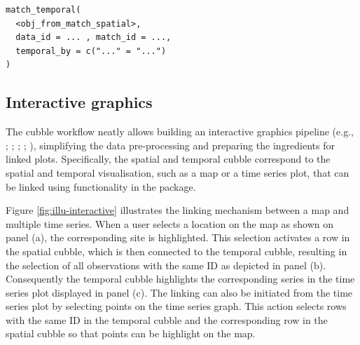 \documentclass[
  shortnames]{jss}
\begin{document}
\begin{verbatim}
match_temporal(
  <obj_from_match_spatial>, 
  data_id = ... , match_id = ..., 
  temporal_by = c("..." = "...")
)
\end{verbatim}

\hypertarget{interactive-graphics}{%
\subsection{Interactive graphics}\label{interactive-graphics}}

The cubble workflow neatly allows building an interactive graphics pipeline (e.g., \citet{buja1988elements}; \citet{buja1996interactive}; \citet{sutherland2000orca}; \citet{xie2014reactive}; \citet{cheng2016enabling}), simplifying the data pre-processing and preparing the ingredients for linked plots. Specifically, the spatial and temporal cubble correspond to the spatial and temporal visualisation, such as a map or a time series plot, that can be linked using functionality in the  \citep{crosstalk} package.

Figure \ref{fig:illu-interactive} illustrates the linking mechanism between a map and multiple time series. When a user selects a location on the map as shown on panel (a), the corresponding site is highlighted. This selection activates a row in the spatial cubble, which is then connected to the temporal cubble, resulting in the selection of all observations with the same ID as depicted in panel (b). Consequently the temporal cubble highlights the corresponding series in the time series plot displayed in panel (c). The linking can also be initiated from the time series plot by selecting points on the time series graph. This action selects rows with the same ID in the temporal cubble and the corresponding row in the spatial cubble so that points can be highlight on the map.
\end{document}

